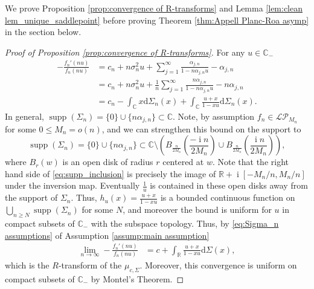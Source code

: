\documentclass[reqno]{amsart}
\newcommand{\1}{\mathbf{1}}
\DeclareMathOperator{\supp}{supp}
\newcommand{\dd}{\mathrm{d}}
\DeclareMathOperator{\ii}{i}
\newcommand{\C}{\mathbb{C}}
\newcommand{\R}{\mathbb{R}}
\def\R{\mathbb{R}}
\newcommand{\LP}{\mathcal{LP}}
\theoremstyle{plain}
\theoremstyle{definition}
\theoremstyle{remark}
\numberwithin{equation}{section}
\begin{document}
We prove Proposition \ref{prop:convergence of R-transforms} and Lemma \ref{lem:clean lem_unique_saddlepoint}  before proving Theorem \ref{thm:Appell Planc-Roa asymp} in the section below. 


\begin{proof}[Proof of Proposition \ref{prop:convergence of R-transforms}]
	For any $u\in\C_{-}$ \begin{equation}
		\begin{aligned}
			-\frac{f_{n}'(nu)}{f_{n}(nu)}&=c_{n}+n\sigma_{n}^2u+\sum_{j=1}^{\infty}\frac{\alpha_{j,n}}{1-n\alpha_{j,n}u}-\alpha_{j,n}\\
			&=c_n+n\sigma_{n}^{2}u+\frac{1}{n}\sum_{j=1}^{\infty}\frac{n\alpha_{j,n}}{1-n\alpha_{j,n}u}-n\alpha_{j,n}\\
			&=c_n-\int_{\C}x\dd\Sigma_{n}(x)+\int_{\C}\frac{u+x}{1-xu}\dd\Sigma_{n}(x).
		\end{aligned}
	\end{equation}  In general, $\supp\left(\Sigma_{n}\right)=\{0\}\cup\{n\alpha_{j,n}\}\subset\C$. Note, by assumption  $f_{n}\in\LP_{M_n}$ for some $0\leq M_n=o(n)$, and we can strengthen this bound on the support to  \begin{equation}\label{eq:supp_inclusion}
		\supp\left(\Sigma_{n}\right)=\{0\}\cup\{n\alpha_{j,n}\}\subset \C\setminus \left(B_{\frac{n}{2M_n} }\left(\frac{-\ii n}{2M_n}\right)\cup B_{\frac{n}{2M_n} }\left(\frac{\ii n}{2M_n}\right) \right),
	\end{equation} where $B_{r}(w)$ is an open disk of radius $r$ centered at $w$. Note that the right hand side of \eqref{eq:supp_inclusion} is precisely the image of $\R+\ii[-M_n/n,M_n/n]$ under the inversion map. Eventually $\frac{1}{u}$ is contained in these open disks away from the support of $\Sigma_{n}$. Thus, $h_{u}(x)=\frac{u+x}{1-xu}$ is a bounded continuous function on $\bigcup_{n\geq N}\supp\left(\Sigma_{n}\right)$ for some $N$, and moreover the bound is uniform for $u$ in compact subsets of $\C_{-}$ with the subspace topology. Thus, by \eqref{eq:Sigma_n assumptions} of Assumption \ref{assump:main assumption} \begin{equation}
		\begin{aligned}
			\lim\limits_{n\rightarrow\infty}-\frac{f_{n}'(nu)}{f_{n}(nu)}&= c+ \int_{\R}\frac{u+x}{1-xu} \dd\Sigma(x), %
		\end{aligned}
	\end{equation} which is the $R$-transform of the $\mu_{c,\Sigma}$. Moreover, this convergence is uniform on compact subsets of $\C_{-}$ by Montel's Theorem.
	

\end{proof}
\end{document}
